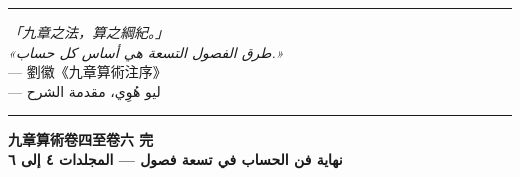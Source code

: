 \documentclass[11pt,a4paper]{article}
\newcommand{\shortline}{\noindent\rule{0.5\textwidth}{0.4pt}\par}
\begin{document}
\vspace{0.8cm}

\begin{center}
\shortline
\vspace{0.4cm}

\textit{「九章之法，算之綱紀。」}\\
\arabicfont\beginR\textit{«طرق الفصول التسعة هي أساس كل حساب.»}\endR\\
--- 劉徽《九章算術注序》\\
--- ليو هُوِي، مقدمة الشرح

\vspace{0.4cm}
\shortline
\end{center}

\vspace{0.8cm}

\begin{center}
\textbf{九章算術卷四至卷六 完}\\[0.3em]
\arabicfont\beginR\textbf{نهاية فن الحساب في تسعة فصول --- المجلدات ٤ إلى ٦}\endR
\end{center}
\end{document}
